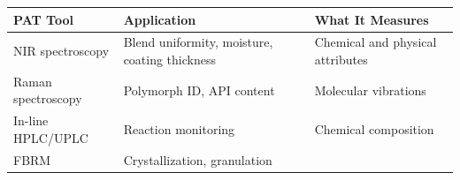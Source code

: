 \documentclass[
  11pt,
  a4paper,
]{report}
\begin{document}
\begin{longtable}[]{@{}lll@{}}
\toprule
\begin{minipage}[b]{0.23\columnwidth}\raggedright
PAT Tool\strut
\end{minipage} & \begin{minipage}[b]{0.30\columnwidth}\raggedright
Application\strut
\end{minipage} & \begin{minipage}[b]{0.39\columnwidth}\raggedright
What It Measures\strut
\end{minipage}\tabularnewline
\midrule
\endhead
\begin{minipage}[t]{0.23\columnwidth}\raggedright
NIR spectroscopy\strut
\end{minipage} & \begin{minipage}[t]{0.30\columnwidth}\raggedright
Blend uniformity, moisture, coating thickness\strut
\end{minipage} & \begin{minipage}[t]{0.39\columnwidth}\raggedright
Chemical and physical attributes\strut
\end{minipage}\tabularnewline
\begin{minipage}[t]{0.23\columnwidth}\raggedright
Raman spectroscopy\strut
\end{minipage} & \begin{minipage}[t]{0.30\columnwidth}\raggedright
Polymorph ID, API content\strut
\end{minipage} & \begin{minipage}[t]{0.39\columnwidth}\raggedright
Molecular vibrations\strut
\end{minipage}\tabularnewline
\begin{minipage}[t]{0.23\columnwidth}\raggedright
In-line HPLC/UPLC\strut
\end{minipage} & \begin{minipage}[t]{0.30\columnwidth}\raggedright
Reaction monitoring\strut
\end{minipage} & \begin{minipage}[t]{0.39\columnwidth}\raggedright
Chemical composition\strut
\end{minipage}\tabularnewline
\begin{minipage}[t]{0.23\columnwidth}\raggedright
FBRM\strut
\end{minipage} & \begin{minipage}[t]{0.30\columnwidth}\raggedright
Crystallization, granulation\strut
\end{minipage} & \begin{minipage}[t]{0.39\columnwidth}\raggedright

\end{minipage}
\end{longtable}
\end{document}
